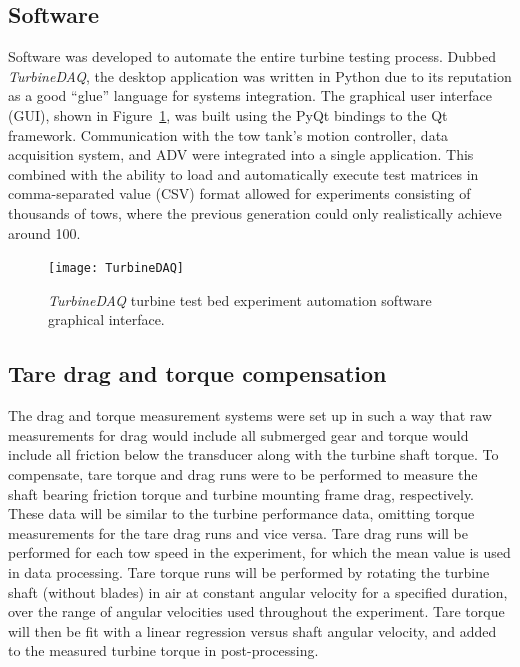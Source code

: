 \subsection{Software}

Software was developed to automate the entire turbine testing process. Dubbed
\textit{TurbineDAQ}, the desktop application was written in Python due to its
reputation as a good ``glue'' language for systems integration. The graphical
user interface (GUI), shown in Figure~\ref{fig:TurbineDAQ}, was built using the
PyQt bindings to the Qt framework. Communication with the tow tank's motion
controller, data acquisition system, and ADV were integrated into a single
application. This combined with the ability to load and automatically execute
test matrices in comma-separated value (CSV) format allowed for experiments
consisting of thousands of tows, where the previous generation could only
realistically achieve around 100.

\begin{figure}[ht]
    \centering
    
    \texttt{[image: TurbineDAQ]}
    
    \caption{\textit{TurbineDAQ} turbine test bed experiment automation software
        graphical interface.}
    
    \label{fig:TurbineDAQ}
\end{figure}


\subsection{Tare drag and torque compensation} 

The drag and torque measurement systems were set up in such a way that raw
measurements for drag would include all submerged gear and torque would include
all friction below the transducer along with the turbine shaft torque. To
compensate, tare torque and drag runs were to be performed to measure the shaft
bearing friction torque and turbine mounting frame drag, respectively. These
data will be similar to the turbine performance data, omitting torque
measurements for the tare drag runs and vice versa. Tare drag runs will be
performed for each tow speed in the experiment, for which the mean value is used
in data processing. Tare torque runs will be performed by rotating the turbine
shaft (without blades) in air at constant angular velocity for a specified
duration, over the range of angular velocities used throughout the experiment.
Tare torque will then be fit with a linear regression versus shaft angular
velocity, and added to the measured turbine torque in post-processing.


